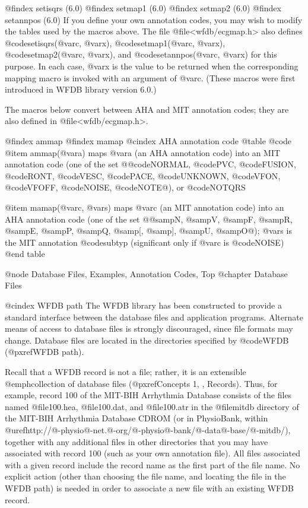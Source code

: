 {{{{{{{{{@findex setisqrs (6.0)
@findex setmap1 (6.0)
@findex setmap2 (6.0)
@findex setannpos (6.0)
If you define your own annotation codes, you may wish to modify the
tables used by the macros above.  The file @file{<wfdb/ecgmap.h>} also defines
@code{setisqrs(@var{c}, @var{x})}, @code{setmap1(@var{c}, @var{x})},
@code{setmap2(@var{c}, @var{x})}, and @code{setannpos(@var{c}, @var{x})}
for this purpose.  In each case, @var{x} is the value to be returned
when the corresponding mapping macro is invoked with an argument of
@var{c}.  (These macros were first introduced in WFDB library version
6.0.)

The macros below convert between AHA and MIT annotation codes;  they are
also defined in @file{<wfdb/ecgmap.h>}.

@findex ammap
@findex mamap
@cindex AHA annotation code
@table @code
@item ammap(@var{a})
maps @var{a} (an AHA annotation code) into an MIT annotation code
(one of the set @{@code{NORMAL}, @code{PVC}, @code{FUSION}, @code{RONT},
@code{VESC}, @code{PACE}, @code{UNKNOWN}, @code{VFON}, @code{VFOFF},
@code{NOISE}, @code{NOTE}@}), or @code{NOTQRS}

@item mamap(@var{c}, @var{s})
maps @var{c} (an MIT annotation code) into an AHA annotation code
(one of the set @{@samp{N}, @samp{V}, @samp{F}, @samp{R}, @samp{E},
@samp{P}, @samp{Q}, @samp{[}, @samp{]}, @samp{U}, @samp{O}@}); @var{s}
is the MIT annotation @code{subtyp} (significant only if @var{c} is
@code{NOISE})
@end table

@node     Database Files, Examples, Annotation Codes, Top
@chapter Database Files

@cindex WFDB path
The WFDB library has been constructed to provide a standard interface
between the database files and application programs.  Alternate means of
access to database files is strongly discouraged, since file formats may
change.  Database files are located in the directories specified by
@code{WFDB} (@pxref{WFDB path}).

Recall that a WFDB record is not a file; rather, it is an extensible
@emph{collection} of database files (@pxref{Concepts 1, , Records}).  Thus, for
example, record 100 of the MIT-BIH Arrhythmia Database consists of the files
named @file{100.hea}, @file{100.dat}, and @file{100.atr} in the @file{mitdb}
directory of the MIT-BIH Arrhythmia Database CDROM (or in PhysioBank, within
@uref{http://@-physio@-net.@-org/@-physio@-bank/@-data@-base/@-mitdb/}),
together with any additional files in other directories that you may have
associated with record 100 (such as your own annotation file).  All files
associated with a given record include the record name as the first part of the
file name.  No explicit action (other than choosing the file name, and locating
the file in the WFDB path) is needed in order to associate a new file with an
existing WFDB record.

}}}}}}}}}
